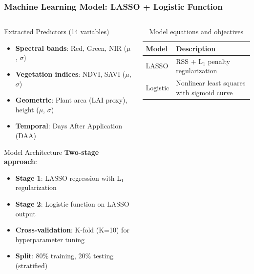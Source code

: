 \documentclass[aspectratio=43]{beamer}
\begin{document}
\begin{frame}
    \frametitle{Machine Learning Model: LASSO + Logistic Function}
    
    \begin{columns}
        \begin{column}{0.5\textwidth}
            \begin{block}{Extracted Predictors (14 variables)}
                \scriptsize
                \begin{itemize}
                    \item \textbf{Spectral bands}: Red, Green, NIR (\ensuremath{\mu}, \ensuremath{\sigma})
                    \item \textbf{Vegetation indices}: NDVI, SAVI (\ensuremath{\mu}, \ensuremath{\sigma})
                    \item \textbf{Geometric}: Plant area (LAI proxy), height (\ensuremath{\mu}, \ensuremath{\sigma})
                    \item \textbf{Temporal}: Days After Application (DAA)
                \end{itemize}
            \end{block}
            
            \begin{exampleblock}{Model Architecture}
                \scriptsize
                \textbf{Two-stage approach}:
                \begin{itemize}
                    \item \textbf{Stage 1}: LASSO regression with L\ensuremath{_1} regularization
                    \item \textbf{Stage 2}: Logistic function on LASSO output
                    \item \textbf{Cross-validation}: K-fold (K=10) for hyperparameter tuning
                    \item \textbf{Split}: 80\% training, 20\% testing (stratified)
                \end{itemize}
            \end{exampleblock}
        \end{column}
        
        \begin{column}{0.5\textwidth}
            \begin{table}[H]
                \centering
                \scriptsize
                \caption{Model equations and objectives}
                \begin{tabular}{|p{2cm}|p{3cm}|}
                \hline
                \textbf{Model} & \textbf{Description} \\
                \hline
                LASSO & RSS + L\ensuremath{_{1}} penalty regularization \\
                \hline
                Logistic & Nonlinear least squares with sigmoid curve \\
                \hline
                \end{tabular}
            \end{table}
            

\end{column}
\end{columns}
\end{frame}
\end{document}
